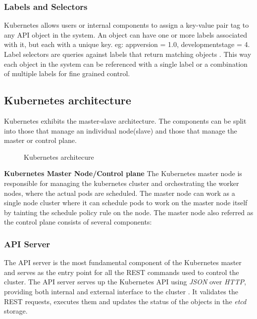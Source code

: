 \documentclass[9pt,twocolumn,twoside]{../../styles/osajnl}
\begin{document}
{\subsubsection{Labels and Selectors}
Kubernetes allows users or internal components to assign a key-value
pair tag to any API object in the system. An object can have one or
more labels associated with it, but each with a unique key. eg:
appversion = 1.0, development\textunderscore stage = 4. Label
selectors are queries against labels that return matching objects
\cite{www-kubernetes-digitalocean}. This way each object in the system
can be referenced with a single label or a combination of multiple
labels for fine grained control.

\subsection{Kubernetes architecture}
Kubernetes exhibits the master-slave architecture. The components can
be split into those that manage an individual node(slave) and those
that manage the master or control plane.

\begin{figure}[htbp]
\centering
{}
\caption{Kubernetes architecure \cite{www-kubernetes-architecture}}
\label{fig:Kubernetes Minimum Architecture}
\end{figure}

\noindent
\textbf{Kubernetes Master Node/Control plane}
\newline
The Kubernetes master node is responsible for managing the kubernetes
cluster and orchestrating the worker nodes, where the actual pods are
scheduled. The master node can work as a single node cluster where it
can schedule pods to work on the master node itself by tainting the
schedule policy rule on the node. The master node also referred as
the control plane consists of several components:

\subsubsection{API Server}
The API server is the most fundamental component of the Kubernetes
master and serves as the entry point for all the REST commands used to
control the cluster. The API server serves up the Kubernetes API using
\emph{JSON} over \emph{HTTP}, providing both internal and external
interface to the cluster \cite{www-kubernetes-digitalocean}
\cite{www-apiserver-kmblog}. It validates the REST requests, executes
them and updates the status of the objects in the \emph{etcd} storage.

}
\end{document}
